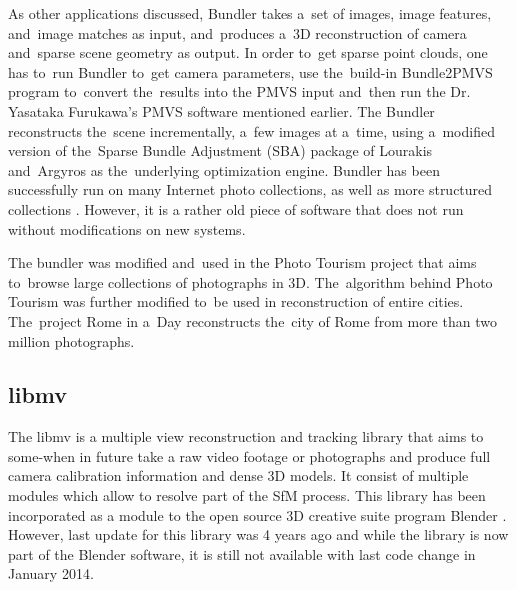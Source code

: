 As other applications discussed, Bundler takes a~set of images, image features, and~image matches as input, and~produces a~3D reconstruction of camera and~sparse scene geometry as output. In order to~get sparse point clouds, one has to~run Bundler to~get camera parameters, use the~build-in Bundle2PMVS program to~convert the~results into the PMVS input and~then run the Dr. Yasataka Furukawa's PMVS software mentioned earlier. The Bundler reconstructs the~scene incrementally, a~few images at a~time, using a~modified version of the~Sparse Bundle Adjustment (SBA) package of Lourakis and~Argyros \cite{www:sba} as the~underlying optimization engine. Bundler has been successfully run on many Internet photo collections, as well as more structured collections \cite{www:bundler}. However, it is a rather old piece of software that does not run without modifications on new systems.

The bundler was modified and~used in the Photo Tourism \cite{article:photo_tourism} \cite{article:photo_tourism2} project that aims to~browse large collections of photographs in 3D. The~algorithm behind Photo Tourism was further modified to~be used in reconstruction of entire cities. The~project Rome in a~Day  \cite{article:rome_in_a_day} \cite{article:reconstructing_rome} \cite{article:rome_in_a_day2} reconstructs the~city of Rome from more than two million photographs.

\subsection*{libmv}
The libmv \cite{www:libmv} is a multiple view reconstruction and tracking library that aims to some-when in future take a raw video footage or photographs and produce full camera calibration information and dense 3D models. It consist of multiple modules which allow to resolve part of the SfM process. This library has been incorporated as a module to the open source 3D creative suite program Blender \cite{www:blender}. However, last update for this library was 4 years ago and while the library is now part of the Blender software, it is still not available with last code change in January 2014.

